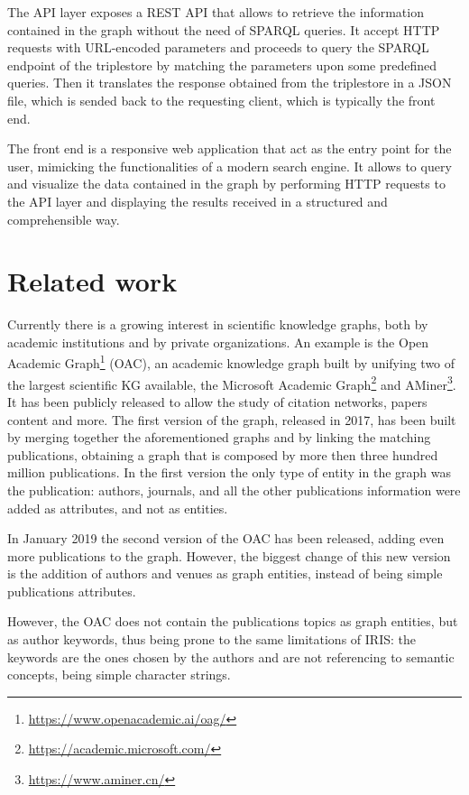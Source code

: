 \documentclass[%
    corpo=13.5pt,
    twoside,
    oldstyle,
    tipotesi=magistrale,
    greek,
    evenboxes
]{toptesi}
\begin{document}
The API layer exposes a REST API that allows to retrieve the information
contained in the graph without the need of SPARQL queries. It accept HTTP
requests with URL-encoded parameters and proceeds to query the SPARQL endpoint
of the triplestore by matching the parameters upon some predefined queries.
Then it translates the response obtained from the triplestore in a JSON file,
which is sended back to the requesting client, which is typically the front end.

The front end is a responsive web application that act as the entry point for
the user, mimicking the functionalities of a modern search engine. It allows
to query and visualize the data contained in the graph by
performing HTTP requests to the API layer and displaying the results received
in a structured and comprehensible way.


\chapter{Related work}

Currently there is a growing interest in scientific
knowledge graphs, both by academic institutions and by private organizations.
An example is the Open Academic
Graph\footnote{\url{https://www.openacademic.ai/oag/}} (OAC), an academic
knowledge graph built by unifying two of the largest
scientific KG available, the Microsoft Academic
Graph\footnote{\url{https://academic.microsoft.com/}}
and AMiner\footnote{\url{https://www.aminer.cn/}}.
It has been publicly released to allow
the study of citation networks, papers content and more.
The first version of the graph, released in 2017, has been
built by merging together the aforementioned graphs and by linking the
matching publications, obtaining a graph that is composed by more then three
hundred million publications. In the first version the only type of entity
in the graph was the publication: authors, journals, and all the other
publications information were added as attributes, and not as entities.

In January 2019 the second version of the OAC has been released, adding even
more publications to the graph. However, the biggest change of this new
version is the addition of authors and venues as graph entities,
instead of being simple publications attributes.

However, the OAC does not contain the publications topics as graph
entities, but as author keywords, thus being prone to the same limitations of
IRIS: the keywords are the ones chosen by the authors and are not
referencing to semantic concepts, being simple character strings.
\newline
\end{document}
